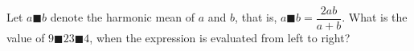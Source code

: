 Let $a\blacksquare b$ denote the harmonic mean of $a$ and $b$, that is, $a\blacksquare b=\dfrac{2ab}{a+b}$. What is the value of $9\blacksquare23\blacksquare4$, when the expression is evaluated from left to right?

